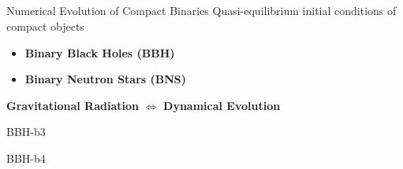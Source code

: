 \documentclass{beamer}
\theoremstyle{definition}
\theoremstyle{plain}
\begin{document}
\subsection{}
\begin{frame}{Numerical Evolution of Compact Binaries}
Quasi-equilibrium initial conditions of compact objects
\vspace{1cm}
\begin{itemize}
\item \textbf{Binary Black Holes (BBH)}
\vspace{0.5cm}
\item \textbf{Binary Neutron Stars (BNS)}
	\end{itemize}
	\vspace{1cm}

\textbf{Gravitational Radiation}
$\Leftrightarrow$
\textbf{Dynamical Evolution}
\end{frame}

\begin{frame}{BBH-b3}
\begin{figure}
    \centering
    \end{figure}
\end{frame}

\begin{frame}{BBH-b4}
\begin{figure}
    \centering
    \end{figure}
\end{frame}
\end{document}

